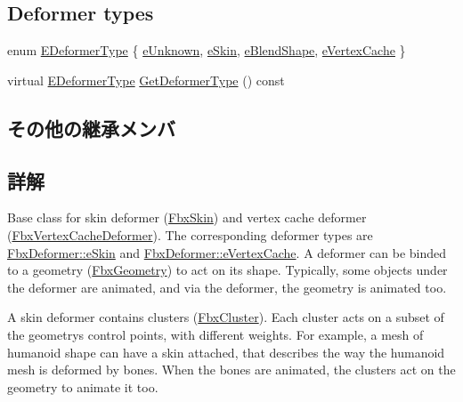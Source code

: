 \subsection*{Deformer types}
\begin{DoxyCompactItemize}
\item 
enum \hyperlink{class_fbx_deformer_a07e2cfb767191ba5c8799fdfbfe3eaf6}{E\+Deformer\+Type} \{ \hyperlink{class_fbx_deformer_a07e2cfb767191ba5c8799fdfbfe3eaf6a432666d716eeff4acebb52aeb7df93ee}{e\+Unknown}, 
\hyperlink{class_fbx_deformer_a07e2cfb767191ba5c8799fdfbfe3eaf6ae219b2649e29244fe4d80e649241c90e}{e\+Skin}, 
\hyperlink{class_fbx_deformer_a07e2cfb767191ba5c8799fdfbfe3eaf6aa59f09ee382f2e19e4923b5b2155b2d9}{e\+Blend\+Shape}, 
\hyperlink{class_fbx_deformer_a07e2cfb767191ba5c8799fdfbfe3eaf6afca1c8188109c1fe60004335f76a42b8}{e\+Vertex\+Cache}
 \}
\item 
virtual \hyperlink{class_fbx_deformer_a07e2cfb767191ba5c8799fdfbfe3eaf6}{E\+Deformer\+Type} \hyperlink{class_fbx_deformer_adbc586e383f788f24d7fce9ed859d481}{Get\+Deformer\+Type} () const
\end{DoxyCompactItemize}
\subsection*{その他の継承メンバ}


\subsection{詳解}
Base class for skin deformer (\hyperlink{class_fbx_skin}{Fbx\+Skin}) and vertex cache deformer (\hyperlink{class_fbx_vertex_cache_deformer}{Fbx\+Vertex\+Cache\+Deformer}). The corresponding deformer types are \hyperlink{class_fbx_deformer_a07e2cfb767191ba5c8799fdfbfe3eaf6ae219b2649e29244fe4d80e649241c90e}{Fbx\+Deformer\+::e\+Skin} and \hyperlink{class_fbx_deformer_a07e2cfb767191ba5c8799fdfbfe3eaf6afca1c8188109c1fe60004335f76a42b8}{Fbx\+Deformer\+::e\+Vertex\+Cache}. A deformer can be binded to a geometry (\hyperlink{class_fbx_geometry}{Fbx\+Geometry}) to act on its shape. Typically, some objects under the deformer are animated, and via the deformer, the geometry is animated too.

A skin deformer contains clusters (\hyperlink{class_fbx_cluster}{Fbx\+Cluster}). Each cluster acts on a subset of the geometry\textquotesingle{}s control points, with different weights. For example, a mesh of humanoid shape can have a skin attached, that describes the way the humanoid mesh is deformed by bones. When the bones are animated, the clusters act on the geometry to animate it too.

